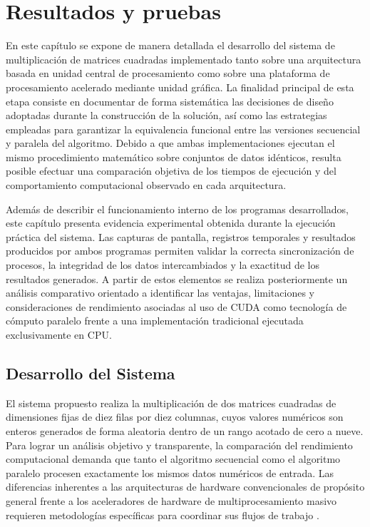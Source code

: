 

\chapter{Resultados y pruebas}

En este capítulo se expone de manera detallada el desarrollo del sistema de multiplicación de matrices cuadradas implementado tanto sobre una arquitectura basada en unidad central de procesamiento como sobre una plataforma de procesamiento acelerado mediante unidad gráfica. La finalidad principal de esta etapa consiste en documentar de forma sistemática las decisiones de diseño adoptadas durante la construcción de la solución, así como las estrategias empleadas para garantizar la equivalencia funcional entre las versiones secuencial y paralela del algoritmo. Debido a que ambas implementaciones ejecutan el mismo procedimiento matemático sobre conjuntos de datos idénticos, resulta posible efectuar una comparación objetiva de los tiempos de ejecución y del comportamiento computacional observado en cada arquitectura.

Además de describir el funcionamiento interno de los programas desarrollados, este capítulo presenta evidencia experimental obtenida durante la ejecución práctica del sistema. Las capturas de pantalla, registros temporales y resultados producidos por ambos programas permiten validar la correcta sincronización de procesos, la integridad de los datos intercambiados y la exactitud de los resultados generados. A partir de estos elementos se realiza posteriormente un análisis comparativo orientado a identificar las ventajas, limitaciones y consideraciones de rendimiento asociadas al uso de CUDA como tecnología de cómputo paralelo frente a una implementación tradicional ejecutada exclusivamente en CPU.

\section{Desarrollo del Sistema}

El sistema propuesto realiza la multiplicación de dos matrices cuadradas de dimensiones fijas de diez filas por diez columnas, cuyos valores numéricos son enteros generados de forma aleatoria dentro de un rango acotado de cero a nueve. Para lograr un análisis objetivo y transparente, la comparación del rendimiento computacional demanda que tanto el algoritmo secuencial como el algoritmo paralelo procesen exactamente los mismos datos numéricos de entrada. Las diferencias inherentes a las arquitecturas de hardware convencionales de propósito general frente a los aceleradores de hardware de multiprocesamiento masivo requieren metodologías específicas para coordinar sus flujos de trabajo \cite{awsGPUCPU}.

